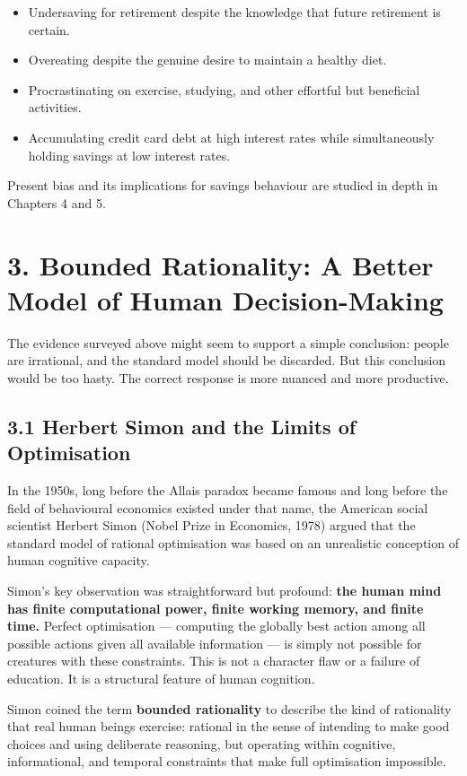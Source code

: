 \documentclass[12pt, letterpaper]{article}
\begin{document}
\begin{itemize}
\item Undersaving for retirement despite the knowledge that future retirement is certain.
\item Overeating despite the genuine desire to maintain a healthy diet.
\item Procrastinating on exercise, studying, and other effortful but beneficial activities.
\item Accumulating credit card debt at high interest rates while simultaneously holding savings at low interest rates.
\end{itemize}

Present bias and its implications for savings behaviour are studied in depth in Chapters 4 and 5.

\medskip


\section{3. Bounded Rationality: A Better Model of Human Decision-Making}


The evidence surveyed above might seem to support a simple conclusion: people are irrational, and the standard model should be discarded. But this conclusion would be too hasty. The correct response is more nuanced and more productive.


\subsection{3.1 Herbert Simon and the Limits of Optimisation}


In the 1950s, long before the Allais paradox became famous and long before the field of behavioural economics existed under that name, the American social scientist Herbert Simon (Nobel Prize in Economics, 1978) argued that the standard model of rational optimisation was based on an unrealistic conception of human cognitive capacity.

Simon's key observation was straightforward but profound: \textbf{the human mind has finite computational power, finite working memory, and finite time.} Perfect optimisation --- computing the globally best action among all possible actions given all available information --- is simply not possible for creatures with these constraints. This is not a character flaw or a failure of education. It is a structural feature of human cognition.

Simon coined the term \textbf{bounded rationality} to describe the kind of rationality that real human beings exercise: rational in the sense of intending to make good choices and using deliberate reasoning, but operating within cognitive, informational, and temporal constraints that make full optimisation impossible.
\end{document}
